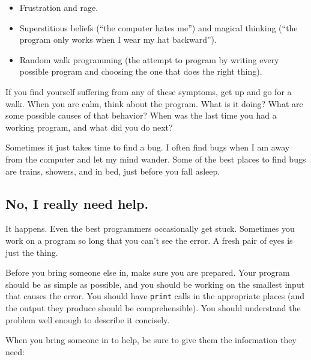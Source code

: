 \documentclass[10pt]{book}
\begin{document}
\begin{itemize}

\item Frustration and rage.


\item Superstitious beliefs (``the computer hates me'') and
magical thinking (``the program only works when I wear my
hat backward'').


\item Random walk programming (the attempt to program by writing
every possible program and choosing the one that does the right
thing).


\end{itemize}

If you find yourself suffering from any of these symptoms, get
up and go for a walk.  When you are calm, think about the program.
What is it doing?  What are some possible causes of that
behavior?  When was the last time you had a working program,
and what did you do next?

Sometimes it just takes time to find a bug.  I often find bugs
when I am away from the computer and let my mind wander.  Some
of the best places to find bugs are trains, showers, and in bed,
just before you fall asleep.


\subsection{No, I really need help.}

It happens.  Even the best programmers occasionally get stuck.
Sometimes you work on a program so long that you can't see the
error.  A fresh pair of eyes is just the thing.

Before you bring someone else in, make sure you are prepared.
Your program should be as simple
as possible, and you should be working on the smallest input
that causes the error.  You should have {\tt print} calls in the
appropriate places (and the output they produce should be
comprehensible).  You should understand the problem well enough
to describe it concisely.

When you bring someone in to help, be sure to give
them the information they need:
\end{document}
